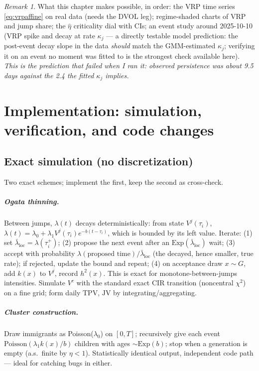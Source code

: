 \documentclass[11pt]{report}
\theoremstyle{definition}
\theoremstyle{remark}
\newtheorem{impact}[theorem]{Remark}
\newcommand{\Vc}{V^{c}}
\newcommand{\Vj}{V^{j}}
\newcommand{\TPV}{\mathrm{TPV}}
\newcommand{\JV}{\mathrm{JV}}
\begin{document}
\begin{impact}
What this chapter makes possible, in order: the VRP time series
\eqref{eq:vrpaffine} on real data (needs the DVOL leg); regime-shaded charts
of VRP and jump share; the $\hat\eta$ criticality dial with CIs; an event
study around 2025-10-10 (VRP spike and decay at rate $\kappa_{j}$ ---
a directly testable model prediction: the post-event decay slope in the
data \emph{should} match the GMM-estimated $\kappa_{j}$; verifying it on
an event no moment was fitted to is the strongest check available here).
\emph{This is the prediction that failed when I ran it: observed persistence
was about 9.5 days against the 2.4 the fitted $\kappa_{j}$ implies.}
\end{impact}

\chapter{Implementation: simulation, verification, and code changes}
\label{ch:impl}

\section{Exact simulation (no discretization)}

Two exact schemes; implement the first, keep the second as cross-check.

\paragraph{Ogata thinning.} Between jumps, $\lambda(t)$ decays
deterministically: from state $\Vj(\tau_{i})$,
$\lambda(t)=\lambda_{0}+\lambda_{1}\Vj(\tau_{i})e^{-b(t-\tau_{i})}$, which is
bounded by its left value. Iterate: (1) set
$\bar\lambda_{\text{loc}}=\lambda(\tau_{i}^{+})$; (2) propose the next event
after an $\mathrm{Exp}(\bar\lambda_{\text{loc}})$ wait; (3) accept with
probability $\lambda(\text{proposed time})/\bar\lambda_{\text{loc}}$
(the decayed, hence smaller, true rate); if rejected, update the bound and
repeat; (4) on acceptance draw $x\sim G$, add $k(x)$ to $\Vj$, record
$h^{2}(x)$. This is exact for monotone-between-jumps intensities. Simulate
$\Vc$ with the standard exact CIR transition (noncentral $\chi^{2}$) on a
fine grid; form daily $\TPV$, $\JV$ by integrating/aggregating.

\paragraph{Cluster construction.} Draw immigrants as Poisson($\lambda_{0}$)
on $[0,T]$; recursively give each event $\mathrm{Poisson}(\lambda_{1}k(x)/b)$
children with ages $\sim\mathrm{Exp}(b)$; stop when a generation is empty
(a.s.\ finite by $\eta<1$). Statistically identical output, independent code
path --- ideal for catching bugs in either.
\end{document}
